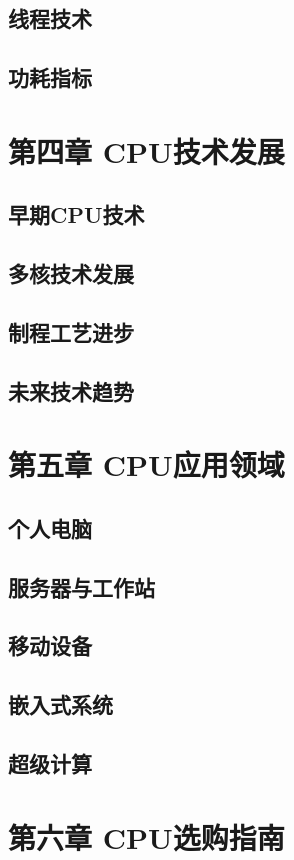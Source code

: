 \documentclass[12pt,UTF8]{ctexbook}
\begin{document}
\section{线程技术}
\section{功耗指标}

\chapter{第四章 CPU技术发展}

\section{早期CPU技术}
\section{多核技术发展}
\section{制程工艺进步}
\section{未来技术趋势}

\chapter{第五章 CPU应用领域}

\section{个人电脑}
\section{服务器与工作站}
\section{移动设备}
\section{嵌入式系统}
\section{超级计算}

\chapter{第六章 CPU选购指南}
\end{document}
